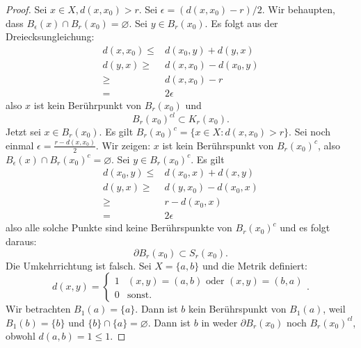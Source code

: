 \begin{proof}
Sei $x\in X, d(x,x_0)>r$. Sei $\epsilon = (d(x,x_0) - r) / 2$. Wir behaupten, dass $B_\epsilon(x)\cap B_r(x_0)=\varnothing$. Sei $y\in B_r(x_0)$. Es folgt aus der Dreiecksungleichung: 
\begin{align*}
	d(x,x_0)\le& d(x_0,y)+d(y,x)\\
	d(y,x)\ge& d(x,x_0)-d(x_0,y)\\
	\ge& d(x,x_0)-r\\
	=& 2\epsilon
\end{align*}
also $x$ ist kein Berührpunkt von $B_r(x_0)$ und
\[
	B_r(x_0)^{cl}\subset K_r(x_0) 
.\]
Jetzt sei $x\in B_r(x_0)$. Es gilt $B_r(x_0)^c=\{x\in X:d(x,x_0)>r\} $. Sei noch einmal $\epsilon=\frac{r - d(x,x_0)}{2}$. Wir zeigen: $x$ ist kein Berührspunkt von $B_r(x_0)^c$, also $B_\epsilon(x)\cap B_r(x_0)^c=\varnothing$. Sei $y\in B_r(x_0)^c$. Es gilt
\begin{align*}
	d(x_0,y)\le& d(x_0,x)+d(x,y)\\
	d(y,x)\ge& d(y,x_0)-d(x_0,x)\\
	\ge& r-d(x_0,x)\\
	=& 2\epsilon
\end{align*}
also alle solche Punkte sind keine Berührspunkte von $B_r(x_0)^c$ und es folgt daraus:
\[
\partial B_r(x_0)\subset S_r(x_0)
.\] 
Die Umkehrrichtung ist falsch. Sei $X=\{a,b\} $ und die Metrik definiert:
\[
d(x,y)=\begin{cases}
	1 & (x,y)=(a,b)\text{ oder }(x,y)=(b,a)\\
	0 & \text{sonst}.
\end{cases}
.\] 
Wir betrachten $B_1(a) =\{a\} $. Dann ist $b$ kein Berührspunkt von $B_1(a)$, weil $B_1(b)=\{b\} $ und $\{b\} \cap \{a\} =\varnothing$. Dann ist $b$ in weder $\partial B_r(x_0)$ noch $B_r(x_0)^{cl}$, obwohl $d(a,b)=1\le 1$.
\end{proof}
